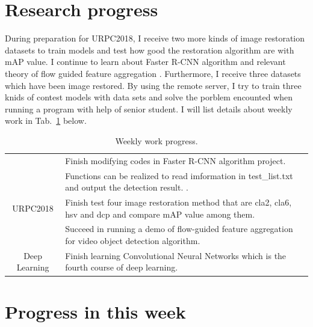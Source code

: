 \documentclass[a4paper]{article}
\begin{document}
\section{Research progress}

During preparation for URPC2018, I receive two more kinds of image restoration datasets to train models and test how good the restoration algorithm are with mAP value. I continue to learn about Faster R-CNN algorithm \cite{Ren2015Faster} and relevant theory of flow guided feature aggregation \cite{zhu17fgfa}. Furthermore, I receive three datasets which have been image restored. By using the remote server, I try to train three knids of contest models with data sets and solve the porblem encounted when running a program with help of senior student. I will list details about weekly work in Tab.~\ref{t1} below. 

\begin{table}[hb]
	\centering
	\caption{Weekly work progress.}
	\begin{tabular}{c|p{10cm}}
		\hline 
		& Finish modifying codes in Faster R-CNN algorithm project.\\
		
		& Functions can be realized to read imformation in test\_list.txt and output the detection result.
		. \\
		
		URPC2018 &Finish test four image restoration method that are cla2, cla6, hsv and dcp and compare mAP value among them.\\
		
		& Succeed in running a demo of flow-guided feature aggregation for video object detection algorithm.\\
		\hline
		Deep Learning& Finish learning Convolutional Neural Networks which is the fourth course of deep learning.\\
		\hline
	\end{tabular}
	\label{t1}
\end{table} 


\section{Progress in this week}
\end{document}
